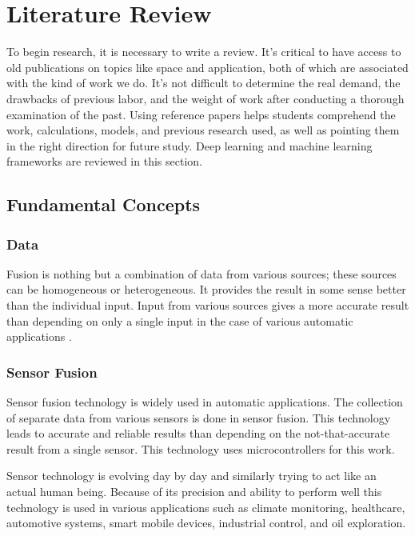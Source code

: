 \chapter{Literature Review}

To begin research, it is necessary to write a review. It's critical to have access to old publications on topics like space and application, both of which are associated with the kind of work we do. It's not difficult to determine the real demand, the drawbacks of previous labor, and the weight of work after conducting a thorough examination of the past. Using reference papers helps students comprehend the work, calculations, models, and previous research used, as well as pointing them in the right direction for future study. Deep learning and machine learning frameworks are reviewed in this section.

\section{Fundamental Concepts}
\subsection{Data}

Fusion is nothing but a combination of data from various sources; these sources can be homogeneous or heterogeneous. It provides the result in some sense better than the individual input. Input from various sources gives a more accurate result than depending on only a single input in the case of various automatic applications \cite{dattaad:10.1504}.


\subsection{Sensor Fusion}

Sensor fusion technology is widely used in automatic applications. The collection of separate data from various sensors is done in sensor fusion. This technology leads to accurate and reliable results than depending on the not-that-accurate result from a single sensor. This technology uses microcontrollers for this work.

Sensor technology is evolving day by day and similarly trying to act like an actual human being. Because of its precision and ability to perform well this technology is used in various applications such as climate monitoring, healthcare, automotive systems, smart mobile devices, industrial control, and oil exploration.

